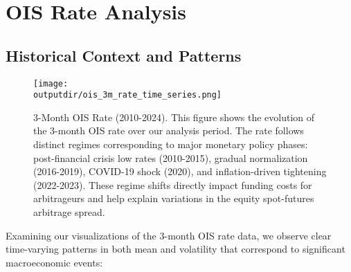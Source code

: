 \documentclass{article}
\newcommand{\outputdir}{../_output}
\begin{document}
\section{OIS Rate Analysis}
\subsection{Historical Context and Patterns}

\begin{figure}[H]
  \centering
  \texttt{[image: \\outputdir/ois\_3m\_rate\_time\_series.png]}
  \caption{3-Month OIS Rate (2010-2024). This figure shows the evolution of the 3-month OIS rate over our analysis period. The rate follows distinct regimes corresponding to major monetary policy phases: post-financial crisis low rates (2010-2015), gradual normalization (2016-2019), COVID-19 shock (2020), and inflation-driven tightening (2022-2023). These regime shifts directly impact funding costs for arbitrageurs and help explain variations in the equity spot-futures arbitrage spread.}
  \label{fig:ois_time_series}
\end{figure}

Examining our visualizations of the 3-month OIS rate data, we observe clear time-varying patterns in both mean and volatility that correspond to significant macroeconomic events:
\end{document}
